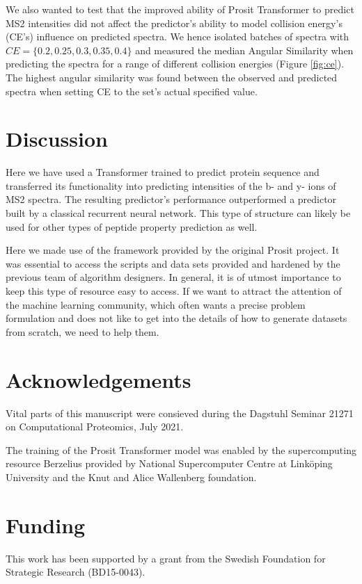 \documentclass[10pt,a4paper]{article}
\begin{document}
We also wanted to test that the improved ability of Prosit Transformer to predict MS2 intensities did not affect the predictor’s ability to model collision energy’s (CE’s) influence on predicted spectra. We hence isolated batches of spectra with $\textit{CE}=\{0.2, 0.25, 0.3, 0.35, 0.4\}$ and measured the median Angular Similarity when predicting the spectra for a range of different collision energies (Figure \ref{fig:ce}). The highest angular similarity was found between the observed and predicted spectra when setting CE to the set’s actual specified value.

\section*{Discussion}
Here we have used a Transformer trained to predict protein sequence and transferred its functionality into predicting intensities of the b- and y- ions of MS2 spectra. The resulting predictor’s performance outperformed a predictor built by a classical recurrent neural network. This type of structure can likely be used for other types of peptide property prediction as well.

Here we made use of the framework provided by the original Prosit project. It was essential to access the scripts and data sets provided and hardened by the previous team of algorithm designers. In general, it is of utmost importance to keep this type of resource easy to access. If we want to attract the attention of the machine learning community, which often wants a precise problem formulation and does not like to get into the details of how to generate datasets from scratch, we need to help them.


\section*{Acknowledgements}
Vital parts of this manuscript were consieved during the Dagstuhl Seminar 21271 on Computational Proteomics, July 2021.

The training of the Prosit Transformer model was enabled by the supercomputing resource Berzelius provided by National Supercomputer Centre at Linköping University and the Knut and Alice Wallenberg foundation.

\section*{Funding}

This work has been supported by a grant from the Swedish Foundation for Strategic Research (BD15-0043).
\end{document}
